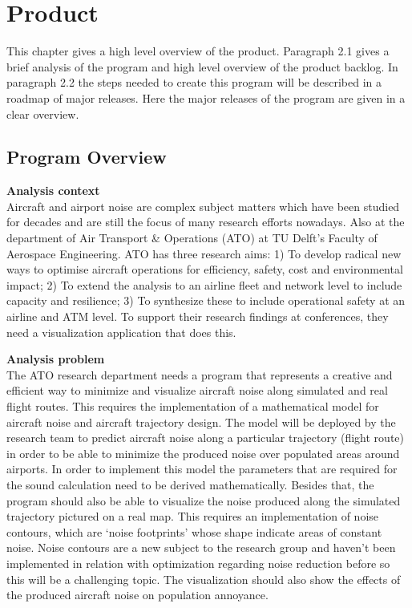 \section{Product}

This chapter gives a high level overview of the product. Paragraph 2.1 gives a brief analysis of the program and high level overview of the product backlog. In paragraph 2.2 the steps needed to create this program will be described in a roadmap of major releases. Here the major releases of the program are given in a clear overview.

\subsection{Program Overview}

\textbf{Analysis context} \\
Aircraft and airport noise are complex subject matters which have been studied for decades and are still the focus of many research efforts nowadays. Also at the department of Air Transport \& Operations (ATO) at TU Delft’s Faculty of Aerospace Engineering. ATO has three research aims: 1) To develop radical new ways to optimise aircraft operations for efficiency, safety, cost and environmental impact; 2) To extend the analysis to an airline fleet and network level to include capacity and resilience; 3) To synthesize these to include operational safety at an airline and ATM level. To support their research findings at conferences, they need a visualization application that does this.

\textbf{Analysis problem} \\
The ATO research department needs a program that represents a creative and efficient way to minimize and visualize aircraft noise along simulated and real flight routes. This requires the implementation of a mathematical model for aircraft noise and aircraft trajectory design. The model will be deployed by the research team to predict aircraft noise along a particular trajectory (flight route) in order to be able to minimize the produced noise over populated areas around airports. In order to implement this model the parameters that are required for the sound calculation need to be derived mathematically. Besides that, the program should also be able to visualize the noise produced along the simulated trajectory pictured on a real map. This requires an implementation of noise contours, which are ‘noise footprints’ whose shape indicate areas of constant noise. Noise contours are a new subject to the research group and haven’t been implemented in relation with optimization regarding noise reduction before so this will be a challenging topic. The visualization should also show the effects of the produced aircraft noise on population annoyance.


